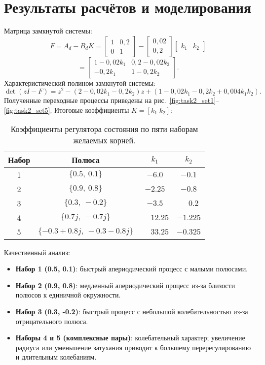 \section{Результаты расчётов и моделирования}
Матрица замкнутой системы:
\[
  F = A_d - B_d K = \begin{bmatrix} 1 & 0{,}2 \\ 0 & 1 \end{bmatrix} - \begin{bmatrix} 0{,}02 \\ 0{,}2 \end{bmatrix} \begin{bmatrix} k_1 & k_2 \end{bmatrix}
\]
\[
  = \begin{bmatrix} 1-0{,}02k_1 & 0{,}2-0{,}02k_2 \\ -0{,}2k_1 & 1-0{,}2k_2 \end{bmatrix}.
\]
Характеристический полином замкнутой системы:
\[
  \det(zI - F) = z^2 - (2-0{,}02k_1-0{,}2k_2)z + (1-0{,}02k_1-0{,}2k_2+0{,}004k_1k_2).
\]
Полученные переходные процессы приведены на рис.~\ref{fig:task2_set1}–\ref{fig:task2_set5}. Итоговые коэффициенты \(K=[k_1\;k_2]\):

\begin{table}[H]
  \centering
  \begin{tabular}{cccc}
    \toprule
    Набор & Полюса & $k_1$ & $k_2$ \\
    \midrule
    1 & $\{0.5,\ 0.1\}$ & $-6.0$ & $-0.1$ \\
    2 & $\{0.9,\ 0.8\}$ & $-2.25$ & $-0.8$ \\
    3 & $\{0.3,\ -0.2\}$ & $-3.5$ & $\phantom{-}0.2$ \\
    4 & $\{0.7j,\ -0.7j\}$ & $\phantom{-}12.25$ & $-1.225$ \\
    5 & $\{-0.3\!+\!0.8j,\ -0.3\!-\!0.8j\}$ & $\phantom{-}33.25$ & $-0.325$ \\
    \bottomrule
  \end{tabular}
  \caption{Коэффициенты регулятора состояния по пяти наборам желаемых корней.}
\end{table}

Качественный анализ:
\begin{itemize}
  \item \textbf{Набор 1 (0.5, 0.1)}: быстрый апериодический процесс с малыми полюсами.
  \item \textbf{Набор 2 (0.9, 0.8)}: медленный апериодический процесс из-за близости полюсов к единичной окружности.
  \item \textbf{Набор 3 (0.3, -0.2)}: быстрый процесс с небольшой колебательностью из-за отрицательного полюса.
  \item \textbf{Наборы 4 и 5 (комплексные пары)}: колебательный характер; увеличение радиуса или уменьшение затухания приводит к большему перерегулированию и длительным колебаниям.
\end{itemize}

